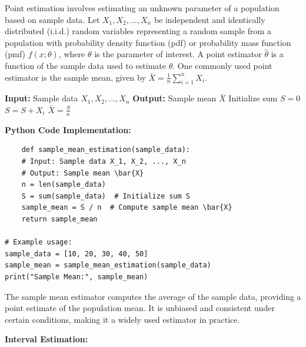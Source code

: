 \documentclass[12pt]{book} %
\begin{document}
Point estimation involves estimating an unknown parameter of a population based on sample data. Let \(X_1, X_2, ..., X_n\) be independent and identically distributed (i.i.d.) random variables representing a random sample from a population with probability density function (pdf) or probability mass function (pmf) \(f(x; \theta)\), where \(\theta\) is the parameter of interest. A point estimator \(\hat{\theta}\) is a function of the sample data used to estimate \(\theta\). One commonly used point estimator is the sample mean, given by \(\bar{X} = \frac{1}{n} \sum_{i=1}^{n} X_i\).
\FloatBarrier
\begin{algorithm}[H]
\caption{Sample Mean Estimation}
\begin{algorithmic}[1]
\State \textbf{Input:} Sample data \(X_1, X_2, ..., X_n\)
\State \textbf{Output:} Sample mean \(\bar{X}\)
\State Initialize sum \(S = 0\)
    \State \(S = S + X_i\)
\EndFor
\State \(\bar{X} = \frac{S}{n}\)
\end{algorithmic}
\end{algorithm}
\FloatBarrier
\textbf{Python Code Implementation:}
\FloatBarrier
\begin{lstlisting}
    def sample_mean_estimation(sample_data):
    # Input: Sample data X_1, X_2, ..., X_n
    # Output: Sample mean \bar{X}
    n = len(sample_data)
    S = sum(sample_data)  # Initialize sum S
    sample_mean = S / n  # Compute sample mean \bar{X}
    return sample_mean

# Example usage:
sample_data = [10, 20, 30, 40, 50]
sample_mean = sample_mean_estimation(sample_data)
print("Sample Mean:", sample_mean)
\end{lstlisting}
\FloatBarrier
The sample mean estimator computes the average of the sample data, providing a point estimate of the population mean. It is unbiased and consistent under certain conditions, making it a widely used estimator in practice.

\textbf{Interval Estimation:}
\end{document}
